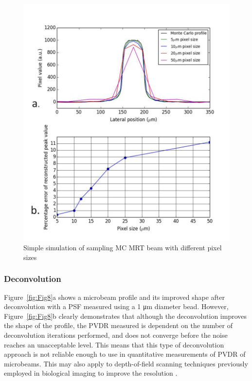 		\begin{figure}
			\centering
			\includegraphics[width=0.8\linewidth]{mrt_img/Beam_10um_sampling}
			\caption{Simple simulation of sampling MC MRT beam with different pixel sizes}
			\label{fig:Beam_10um_sampling}
		\end{figure}
	
	\subsubsection{Deconvolution}
	Figure~\ref{fig:Fig8}a shows a microbeam profile and its improved shape after deconvolution with a PSF measured using a 1 \si{\um} diameter bead. However, Figure~\ref{fig:Fig8}b clearly demonstrates that although the deconvolution improves the shape of the profile, the PVDR measured is dependent on the number of deconvolution iterations performed, and does not converge before the noise reaches an unacceptable level. This means that this type of deconvolution approach is not reliable enough to use in quantitative measurements of PVDR of microbeams. This may also apply to depth-of-field scanning techniques previously employed in biological imaging to improve the resolution \cite{fauverthree-dimensional2005}. 
	
